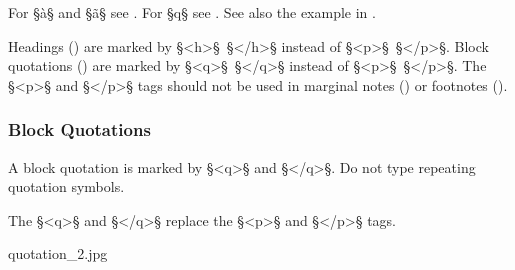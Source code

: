 \begin{crossref}
For  §à§ and §ã§ see . For  §\´q§ see . See also the example in .
\end{crossref}

\begin{note}
Headings () are marked by §<h>§~§</h>§ instead of §<p>§~§</p>§. Block quotations  () are marked by §<q>§~§</q>§ instead of §<p>§~§</p>§. The §<p>§ and §</p>§ tags should not be used in marginal notes () or footnotes (). 
\end{note}


\subsubsection{Block Quotations}
\label{section block quotations}

\begin{mainrule}
A block quotation is marked by §<q>§ and §</q>§. Do not type repeating quotation symbols.
\end{mainrule}

\begin{clarification}
The §<q>§ and §</q>§ replace the §<p>§ and §</p>§ tags.
\end{clarification}

\begin{sampleImage}{quotation_2.jpg} 
\end{sampleImage}

